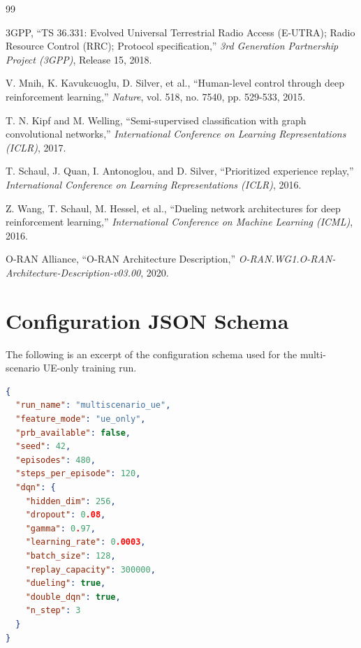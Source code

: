 \documentclass[12pt,a4paper,oneside]{report}
\begin{document}
\clearpage
{}
\begin{thebibliography}{99}

3GPP, ``TS 36.331: Evolved Universal Terrestrial Radio Access (E-UTRA); Radio Resource Control (RRC); Protocol specification,'' \textit{3rd Generation Partnership Project (3GPP)}, Release 15, 2018.

V. Mnih, K. Kavukcuoglu, D. Silver, et al., ``Human-level control through deep reinforcement learning,'' \textit{Nature}, vol. 518, no. 7540, pp. 529-533, 2015.

T. N. Kipf and M. Welling, ``Semi-supervised classification with graph convolutional networks,'' \textit{International Conference on Learning Representations (ICLR)}, 2017.

T. Schaul, J. Quan, I. Antonoglou, and D. Silver, ``Prioritized experience replay,'' \textit{International Conference on Learning Representations (ICLR)}, 2016.

Z. Wang, T. Schaul, M. Hessel, et al., ``Dueling network architectures for deep reinforcement learning,'' \textit{International Conference on Machine Learning (ICML)}, 2016.

O-RAN Alliance, ``O-RAN Architecture Description,'' \textit{O-RAN.WG1.O-RAN-Architecture-Description-v03.00}, 2020.

\end{thebibliography}

\clearpage
\appendix
\chapter{Configuration JSON Schema}
The following is an excerpt of the configuration schema used for the multi-scenario UE-only training run.

\begin{lstlisting}[language=json, caption={multiscenario\_ue.json excerpt}]
{
  "run_name": "multiscenario_ue",
  "feature_mode": "ue_only",
  "prb_available": false,
  "seed": 42,
  "episodes": 480,
  "steps_per_episode": 120,
  "dqn": {
    "hidden_dim": 256,
    "dropout": 0.08,
    "gamma": 0.97,
    "learning_rate": 0.0003,
    "batch_size": 128,
    "replay_capacity": 300000,
    "dueling": true,
    "double_dqn": true,
    "n_step": 3
  }
}
\end{lstlisting}
\end{document}
